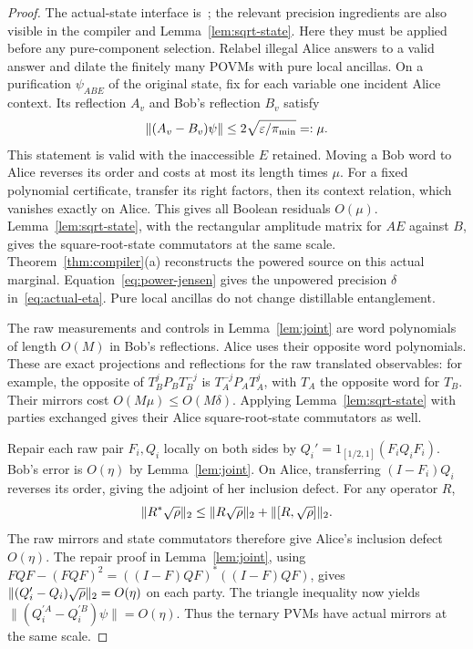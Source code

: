 \begin{proof}
The actual-state interface is~\cite[Proposition~6.1]{DM-precision}; the relevant precision ingredients are also visible in the compiler and Lemma~\ref{lem:sqrt-state}. Here they must be applied before any pure-component selection. Relabel illegal Alice answers to a valid answer and dilate the finitely many POVMs with pure local ancillas. On a purification $\psi_{ABE}$ of the original state, fix for each variable one incident Alice context. Its reflection $A_v$ and Bob's reflection $B_v$ satisfy
\[
 \|(A_v-B_v)\psi\|\le2\sqrt{\varepsilon/\pi_{\min}}=:\mu.
\]
This statement is valid with the inaccessible $E$ retained. Moving a Bob word to Alice reverses its order and costs at most its length times $\mu$. For a fixed polynomial certificate, transfer its right factors, then its context relation, which vanishes exactly on Alice. This gives all Boolean residuals $O(\mu)$. Lemma~\ref{lem:sqrt-state}, with the rectangular amplitude matrix for $AE$ against $B$, gives the square-root-state commutators at the same scale. Theorem~\ref{thm:compiler}(a) reconstructs the powered source on this actual marginal. Equation~\eqref{eq:power-jensen} gives the unpowered precision $\delta$ in~\eqref{eq:actual-eta}. Pure local ancillas do not change distillable entanglement.

The raw measurements and controls in Lemma~\ref{lem:joint} are word polynomials of length $O(M)$ in Bob's reflections. Alice uses their opposite word polynomials. These are exact projections and reflections for the raw translated observables: for example, the opposite of $T_B^jP_BT_B^{-j}$ is $T_A^{-j}P_AT_A^j$, with $T_A$ the opposite word for $T_B$. Their mirrors cost $O(M\mu)\le O(M\delta)$. Applying Lemma~\ref{lem:sqrt-state} with parties exchanged gives their Alice square-root-state commutators as well.

Repair each raw pair $F_i,Q_i$ locally on both sides by $Q_i'=1_{[1/2,1]}(F_iQ_iF_i)$. Bob's error is $O(\eta)$ by Lemma~\ref{lem:joint}. On Alice, transferring $(I-F_i)Q_i$ reverses its order, giving the adjoint of her inclusion defect. For any operator $R$,
\[
 \lVert R^*\sqrt\rho\rVert_2\le\lVert R\sqrt\rho\rVert_2+\lVert[R,\sqrt\rho]\rVert_2.
\]
The raw mirrors and state commutators therefore give Alice's inclusion defect $O(\eta)$. The repair proof in Lemma~\ref{lem:joint}, using $FQF-(FQF)^2=((I-F)QF)^*((I-F)QF)$, gives $\lVert(Q_i'-Q_i)\sqrt\rho\rVert_2=O(\eta)$ on each party. The triangle inequality now yields $\|(Q_i^{\prime A}-Q_i^{\prime B})\psi\|=O(\eta)$. Thus the ternary PVMs have actual mirrors at the same scale.


\end{proof}
